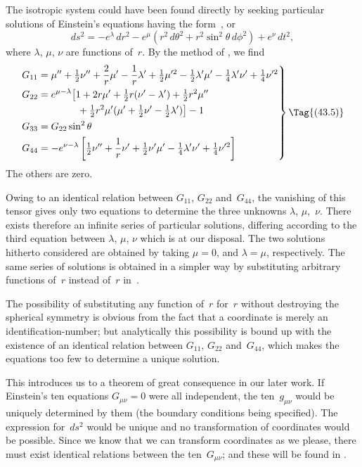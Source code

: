 \documentclass[12pt]{book}
\begin{document}
The isotropic system could have been found directly by seeking particular
solutions of Einstein's equations having the form~, or
\[
ds^{2} = -e^{\lambda}\, dr^{2} - e^{\mu}(r^{2}\, d\theta^2 + r^{2}\sin^{2}\theta\, d\phi^{2}) + e^{\nu}\, dt^{2},
\]
where $\lambda$, $\mu$, $\nu$ are functions of~$r$. By the method of , we find
\[
\left.
\begin{aligned}
G_{11} &= \mu'' + \tfrac{1}{2}\nu'' + \frac{2}{r}\mu' - \frac{1}{r}\lambda' + \tfrac{1}{2}\mu'^{2} - \tfrac{1}{2}\lambda'\mu' - \tfrac{1}{4}\lambda'\nu' + \tfrac{1}{4}\nu'^{2}\\
G_{22} &= e^{\mu-\lambda} \bigl[1 + 2r\mu' + \tfrac{1}{2}r(\nu' - \lambda') + \tfrac{1}{2}r^{2}\mu''\\
  &\qquad\qquad+ \tfrac{1}{2}r^{2}\mu'(\mu' + \tfrac{1}{2}\nu' - \tfrac{1}{2}\lambda')\bigr] - 1\\
G_{33} &= G_{22} \sin^{2}\theta\\
G_{44} &= -e^{\nu-\lambda}\left[\tfrac{1}{2}\nu'' + \frac{1}{r}\nu' + \tfrac{1}{2}\nu'\mu' - \tfrac{1}{4}\lambda'\nu' + \tfrac{1}{4}\nu'^{2}\right]
\end{aligned}
\right\}
\Tag{(43.5)}
\]
The others are zero.

Owing to an identical relation between $G_{11}$, $G_{22}$ and~$G_{44}$, the vanishing of
this tensor gives only two equations to determine the three unknowns $\lambda$, $\mu$,~$\nu$.
There exists therefore an infinite series of particular solutions, differing
according to the third equation between $\lambda$, $\mu$, $\nu$ which is at our disposal. The
two solutions hitherto considered are obtained by taking $\mu = 0$, and $\lambda = \mu$,
respectively. The same series of solutions is obtained in a simpler way by
substituting arbitrary functions of~$r$ instead of~$r$ in~.

The possibility of substituting any function of~$r$ for~$r$ without destroying
the spherical symmetry is obvious from the fact that a coordinate is merely
an identification\hyp{}number; but analytically this possibility is bound up with
the existence of an identical relation between $G_{11}$, $G_{22}$ and~$G_{44}$, which makes
the equations too few to determine a unique solution.

This introduces us to a theorem of great consequence in our later work.
%
If Einstein's ten equations $G_{\mu\nu} = 0$ were all independent, the ten~$g_{\mu\nu}$ would be
uniquely determined by them (the boundary conditions being specified). The
expression for~$ds^{2}$ would be unique and no transformation of coordinates would
be possible. Since we know that we can transform coordinates as we please,
there must exist identical relations between the ten~$G_{\mu\nu}$; and these will be
found in .
\end{document}
